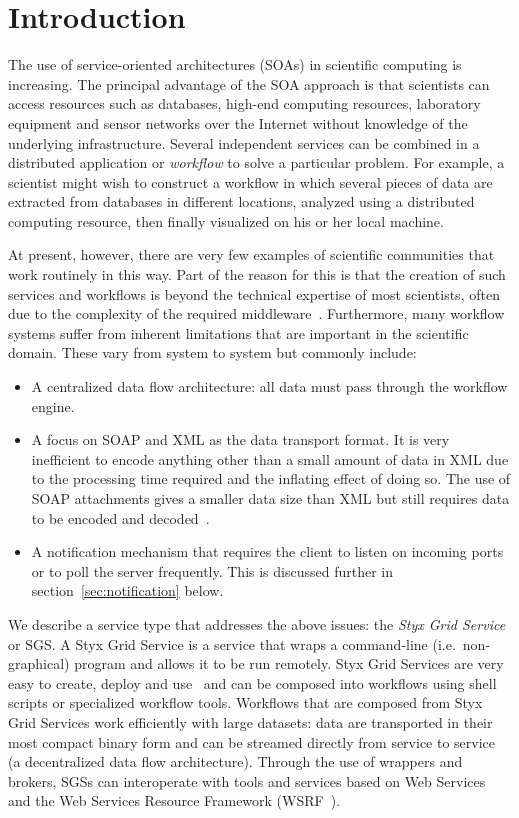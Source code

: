 \documentclass[a4paper]{article}
\begin{document}
\section{Introduction}\label{sec:intro}
The use of service-oriented architectures (SOAs) in scientific computing is increasing.  The principal advantage of the SOA approach is that scientists can access resources such as databases, high-end computing resources, laboratory equipment and sensor networks over the Internet without knowledge of the underlying infrastructure.  Several independent services can be combined in a distributed application or \textit{workflow\/} to solve a particular problem.  For example, a scientist might wish to construct a workflow in which several pieces of data are extracted from databases in different locations, analyzed using a distributed computing resource, then finally visualized on his or her local machine.

At present, however, there are very few examples of scientific communities that work routinely in this way.  Part of the reason for this is that the creation of such services and workflows is beyond the technical expertise of most scientists, often due to the complexity of the required middleware~\cite{chin:2004}.  Furthermore, many workflow systems suffer from inherent limitations that are important in the scientific domain.  These vary from system to system but commonly include:

\begin{itemize}
\item A centralized data flow architecture: all data must pass through the workflow engine.
\item A focus on SOAP and XML as the data transport format.  It is very inefficient to encode anything other than a small amount of data in XML due to the processing time required and the inflating effect of doing so.  The use of SOAP attachments gives a smaller data size than XML but still requires data to be encoded and decoded~\cite{bustamente:2000, chiu:2002, davis:2002}.
\item A notification mechanism that requires the client to listen on incoming ports or to poll the server frequently.  This is discussed further in section~\ref{sec:notification} below.
\end{itemize}

We describe a service type that addresses the above issues: the \textit{Styx Grid Service} or SGS.  A Styx Grid Service is a service that wraps a command-line (i.e.\ non-graphical) program and allows it to be run remotely.  Styx Grid Services are very easy to create, deploy and use~\cite{blower_escience:2006, blower_lncs:2006, blower:2005} and can be composed into workflows using shell scripts or specialized workflow tools.  Workflows that are composed from Styx Grid Services work efficiently with large datasets: data are transported in their most compact binary form and can be streamed directly from service to service (a decentralized data flow architecture).  Through the use of wrappers and brokers, SGSs can interoperate with tools and services based on Web Services and the Web Services Resource Framework (WSRF~\cite{WSRF}).
\end{document}
